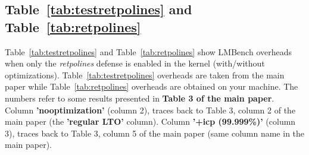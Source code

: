 \documentclass{article}
\begin{document}
\newpage
\subsection{Table~\ref{tab:testretpolines} and Table~\ref{tab:retpolines}}

Table~\ref{tab:testretpolines} and Table~\ref{tab:retpolines} show LMBench overheads when only the \emph{retpolines} defense is
enabled in the kernel (with/without optimizations). Table~\ref{tab:testretpolines} overheads are taken from the main paper while
Table~\ref{tab:retpolines} overheads are obtained on your machine. The numbers refer to some results presented in \textbf{Table 3 of the main
paper}. Column \textbf{'nooptimization'} (column 2), traces back to Table 3, column 2 of the main paper (the \textbf{'regular LTO'} column).
Column \textbf{'+icp (99.999\%)'} (column 3), traces back to Table 3, column 5 of the main paper (same column name in the main paper).

\begin{table}[H]
\begin{center}
\begin{adjustbox}{width=0.5\textwidth}
\large

\end{adjustbox}
\end{center}
\label{tab:testretpolines} 
\end{table}

\begin{table}[H]
\begin{center}
\begin{adjustbox}{width=0.5\textwidth}
\large

\end{adjustbox}
\end{center}
\label{tab:retpolines} 
\end{table}

\newpage
\end{document}
